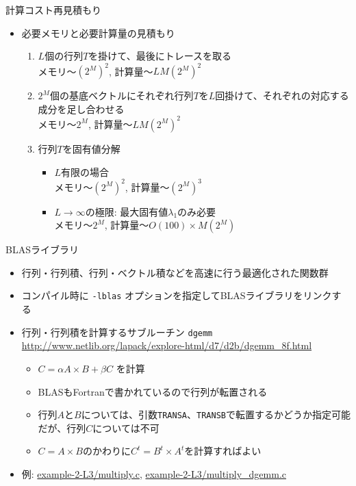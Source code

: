 \documentclass[dvipdfmx]{beamer}
\begin{document}
\begin{frame}[t,fragile]{計算コスト再見積もり}
  \begin{itemize}
    \setlength{\itemsep}{1em}
  \item 必要メモリと必要計算量の見積もり
    \begin{enumerate}
    \item $L$個の行列$T$を掛けて、最後にトレースを取る \\
      メモリ〜$(2^M)^2$, 計算量〜$LM(2^M)^2$
    \item $2^M$個の基底ベクトルにそれぞれ行列$T$を$L$回掛けて、それぞれの対応する成分を足し合わせる \\
      メモリ〜$2^M$, 計算量〜$LM(2^M)^2$
    \item 行列$T$を固有値分解
      \begin{itemize}
        \item $L$有限の場合 \\
          メモリ〜$(2^M)^2$, 計算量〜$(2^M)^3$
        \item $L\rightarrow\infty$の極限: 最大固有値$\lambda_1$のみ必要 \\
          メモリ〜$2^M$, 計算量〜$O(100)\times M(2^M)$
      \end{itemize}
    \end{enumerate}
  \end{itemize}
\end{frame}

\begin{frame}[t,fragile]{BLASライブラリ}
  \begin{itemize}
  \item 行列・行列積、行列・ベクトル積などを高速に行う最適化された関数群
  \item コンパイル時に {\tt -lblas} オプションを指定してBLASライブラリをリンクする
  \item 行列・行列積を計算するサブルーチン {\tt dgemm} \\
    \url{http://www.netlib.org/lapack/explore-html/d7/d2b/dgemm_8f.html}
    \begin{itemize}
    \item $C = \alpha A \times B + \beta C$ を計算
    \item BLASもFortranで書かれているので行列が転置される
    \item 行列$A$と$B$については、引数{\tt TRANSA}、{\tt TRANSB}で転置するかどうか指定可能だが、行列$C$については不可
    \item $C = A \times B$のかわりに$C^t = B^t \times A^t$を計算すればよい
    \end{itemize}
  \item 例: \href{https://github.com/todo-group/computer-experiments/blob/master/exercise/linear_system/multiply.c}{example-2-L3/multiply.c}, \href{https://github.com/todo-group/computer-experiments/blob/master/exercise/linear_system/multiply_dgemm.c}{example-2-L3/multiply\_dgemm.c}
  \end{itemize}
\end{frame}
\end{document}

